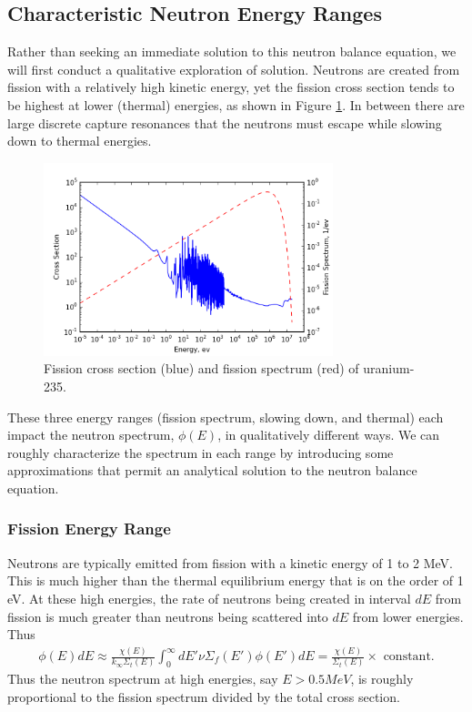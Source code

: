 \documentclass[11pt]{article}
\begin{document}
\subsection{Characteristic Neutron Energy Ranges}
\label{sec:orgheadline30}
Rather than seeking an immediate solution to this neutron balance equation, we will first conduct a qualitative exploration of solution.  Neutrons are created from fission with a relatively high kinetic energy, yet the fission cross section tends to be highest at lower (thermal) energies, as shown in Figure \ref{fig::u235fission}.  In between there are large discrete capture resonances that the neutrons must escape while slowing down to thermal energies.
\begin{figure}
  \centering
  \includegraphics[width=0.75\textwidth]{u235fission.png}
  \caption{Fission cross section (blue) and fission spectrum (red) of uranium-235.}
  \label{fig::u235fission}
\end{figure}

These three energy ranges (fission spectrum, slowing down, and thermal) each impact the neutron spectrum, \(\phi(E)\), in qualitatively different ways.  We can roughly characterize the spectrum in each range by introducing some approximations that permit an analytical solution to the neutron balance equation.
\subsubsection{Fission Energy Range}
\label{sec:orgheadline27}
Neutrons are typically emitted from fission with a kinetic energy of 1 to 2 MeV.  This is much higher than the thermal equilibrium energy that is on the order of 1 eV.  At these high energies, the rate of neutrons being created in interval \(dE\) from fission is much greater than neutrons being scattered into \(dE\) from lower energies.  Thus
\begin{align}
  \phi(E) dE \approx  \frac{\chi(E)}{k_\infty\Sigma_t(E)} \int_0^\infty dE' \nu\Sigma_f(E') \phi(E')  dE = \frac{\chi(E)}{\Sigma_t(E)} \times \text{ constant}.
\end{align}
Thus the neutron spectrum at high energies, say \(E > 0.5 MeV\), is roughly proportional to the fission spectrum divided by the total cross section.
\end{document}

